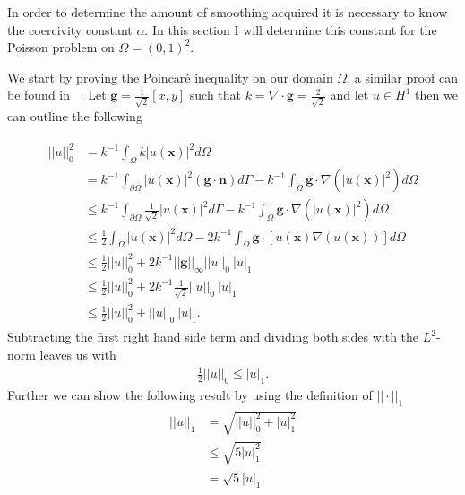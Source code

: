 In order to determine the amount of smoothing acquired it is necessary to know the coercivity constant $\alpha$. In this section I will determine this constant for the Poisson problem on $\Omega = (0,1)^2$.

We start by proving the Poincar\'e inequality on our domain $ \Omega $, a similar proof can be found in ~\cite{Quarteroni}. Let $\mathbf{g} = \frac{1}{\sqrt{2}}[x,y]$ such that $k = \nabla \cdot \mathbf{g}=\frac{2}{\sqrt{2}}$ and let $u \in H^1$ then we can outline the following

\begin{align}
	\begin{split}
	||u||_0^2 &= k^{-1}\int_{\Omega}k|u(\mathbf{x})|^2d\Omega \\
	&=  k^{-1}\int_{\partial \Omega}|u(\mathbf{x})|^2(\mathbf{g}\cdot \mathbf{n})d\Gamma 
	-k^{-1}\int_{\Omega}\mathbf{g}\cdot \nabla(|u(\mathbf{x})|^2)d\Omega \\
	&\leq  k^{-1}\int_{\partial \Omega}\frac{1}{\sqrt{2}}|u(\mathbf{x})|^2d\Gamma 
	-k^{-1}\int_{\Omega}\mathbf{g}\cdot \nabla(|u(\mathbf{x})|^2)d\Omega \\
	&\leq \frac{1}{2} \int_{\Omega}|u(\mathbf{x})|^2d\Omega
	-2k^{-1}\int_{\Omega}\mathbf{g}\cdot [u(\mathbf{x})\nabla(u(\mathbf{x}))]d\Omega \\
	&\leq \frac{1}{2}||u||_0^2 + 2k^{-1}||\mathbf{g}||_{\infty}||u||_0 \: |u|_1\\
	&\leq \frac{1}{2}||u||_0^2 + 2k^{-1}\frac{1}{\sqrt{2}}||u||_0 \: |u|_1\\
	&\leq \frac{1}{2}||u||_0^2 + ||u||_0 \: |u|_1.
	\end{split}
	\label{eq:PoincareProof}
\end{align}
Subtracting the first right hand side term and dividing both sides with the $L^2$-norm leaves us with
\begin{align}
	\frac{1}{2}||u||_0 \leq |u|_1.
	\label{eq:PoincareStatement}
\end{align}
Further we can show the following result by using the definition of $||\cdot||_1$
\begin{align}
	\begin{split}
	||u||_1 &= \sqrt{||u||_0^2+|u|_1^2}\\
	&	\leq \sqrt{5|u|_1^2}\\
	&= \sqrt{5}|u|_1.
	\end{split}
	\label{eq:NormInequalitySobolev}
\end{align}

